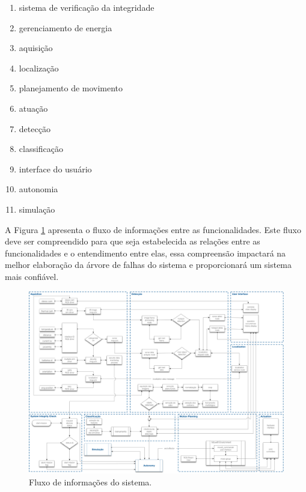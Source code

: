 \begin{enumerate}%
	\item sistema de verificação da integridade
	\item gerenciamento de energia
	\item aquisição
	\item localização
	\item planejamento de movimento
	\item atuação
	\item detecção
	\item classificação
	\item interface do usuário
	\item autonomia
	\item simulação
\end{enumerate}

A Figura \ref{img:elirfluxo} apresenta o fluxo de informações entre as funcionalidades. Este fluxo deve ser compreendido para que seja estabelecida as relações entre as funcionalidades e o entendimento entre elas, essa compreensão impactará na melhor elaboração da árvore de falhas do sistema e proporcionará um sistema mais confiável.

\begin{figure} [h!]	
	\caption{Fluxo de informações do sistema.}
	\label{img:elirfluxo}											 
	\centering													 
	\includegraphics[width=1.0\textwidth]{Figures/flxinfofunctionalities}
\end{figure}													 

